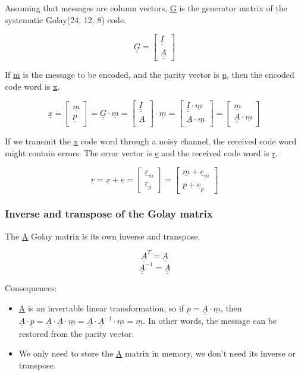 \documentclass[11pt,a4paper,oneside]{report}             %
\def\doubleunderline#1{\underline{\underline{#1}}}
\def\dul#1{\doubleunderline{#1}}
\def\ul#1{\underline{#1}}
\newcommand{\vect}[2]{\begin{bmatrix} #1 \\ #2 \end{bmatrix}}
\begin{document}
Assuming that messages are column vectors, \doubleunderline{G} is the generator matrix
of the systematic Golay(24, 12, 8) code.

\[
    \doubleunderline{G} =
    \begin{bmatrix}
        \doubleunderline{I} \\
        \doubleunderline{A}
    \end{bmatrix}
\]

If \underline{m} is the message to be encoded, and the parity vector is \underline{p},
then the encoded code word is \underline{x}.

\[
    \underline{x} = \begin{bmatrix}
        \underline{m} \\
        \underline{p}
    \end{bmatrix} = \doubleunderline{G} \cdot \underline{m} = \begin{bmatrix}
        \doubleunderline{I} \\
        \doubleunderline{A}
    \end{bmatrix} \cdot \underline{m} = \begin{bmatrix}
        \doubleunderline{I} \cdot \underline{m} \\
        \doubleunderline{A} \cdot \underline{m}
    \end{bmatrix} = \begin{bmatrix}
        \underline{m} \\
        \doubleunderline{A} \cdot \underline{m}
    \end{bmatrix}
\]

If we transmit the \underline{x} code word through a noisy channel, the received code word might
contain errors. The error vector is \underline{e} and the received code word is \underline{r}.

\[
    \ul{r} = \ul{x} + \ul{e} = \vect{\ul{r}_m}{\ul{r}_p} = \vect{\ul{m} + \ul{e}_m}{\ul{p} + \ul{e}_p}
\]

\subsubsection{Inverse and transpose of the Golay matrix}

The \dul{A} Golay matrix is its own inverse and transpose.

\[
    \dul{A}^T = \dul{A}
\]
\[
    \dul{A}^{-1} = \dul{A}
\]

Consequences:
\begin{itemize}
    \item \ul{A} is an invertable linear transformation, so if $\ul{p} = \dul{A} \cdot \ul{m}$, then
          $\dul{A} \cdot \ul{p} = \dul{A} \cdot \dul{A} \cdot \ul{m} = \dul{A} \cdot \dul{A}^{-1} \cdot \ul{m} = \ul{m}$.
          In other words, the message can be restored from the parity vector.
    \item We only need to store the \ul{A} matrix in memory, we don't need its inverse or transpose.
\end{itemize}
\end{document}
